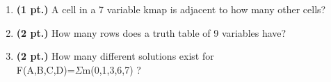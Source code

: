 \documentclass{article}
\begin{document}
\begin{enumerate}
\item {\bf (1 pt.)} A cell in a 7 variable kmap is adjacent to how many other cells?  

\item {\bf (2 pt.)} How many rows does a truth table of 9 variables have?


\pagebreak
\item {\bf (2 pt.)} How many different \SOPmin solutions exist for \\
F(A,B,C,D)=$\Sigma$m(0,1,3,6,7) ?


\end{enumerate}
\end{document}

